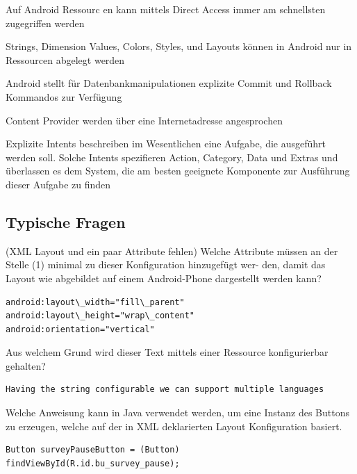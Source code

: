 Auf Android Ressourc en kann mittels Direct Access immer am
schnellsten zugegriffen werden

Strings, Dimension Values, Colors, Styles, und Layouts können in
Android nur in Ressourcen abgelegt werden

Android stellt für Datenbankmanipulationen explizite Commit und
Rollback Kommandos zur Verfügung

Content Provider werden über eine Internetadresse
angesprochen

Explizite Intents beschreiben im Wesentlichen eine Aufgabe, die
ausgeführt werden soll. Solche Intents spezifieren Action,
Category, Data und Extras und überlassen es dem System, die
am besten geeignete Komponente zur Ausführung dieser
Aufgabe zu finden

\subsection{Typische Fragen}
(XML Layout und ein paar Attribute fehlen) Welche Attribute müssen an der
Stelle (1) minimal zu dieser Konfiguration hinzugefügt wer- den, damit das
Layout wie abgebildet auf einem Android-Phone dargestellt werden kann?

\begin{lstlisting}
android:layout\_width="fill\_parent"
android:layout\_height="wrap\_content"
android:orientation="vertical"
\end{lstlisting}

Aus welchem Grund wird dieser Text mittels einer Ressource konfigurierbar
gehalten?
\begin{lstlisting}
Having the string configurable we can support multiple languages
\end{lstlisting}

Welche Anweisung kann in Java verwendet werden, um eine Instanz des Buttons zu
erzeugen, welche auf der in XML deklarierten Layout Konfiguration basiert.
\begin{lstlisting}
Button surveyPauseButton = (Button) findViewById(R.id.bu_survey_pause);
\end{lstlisting}
